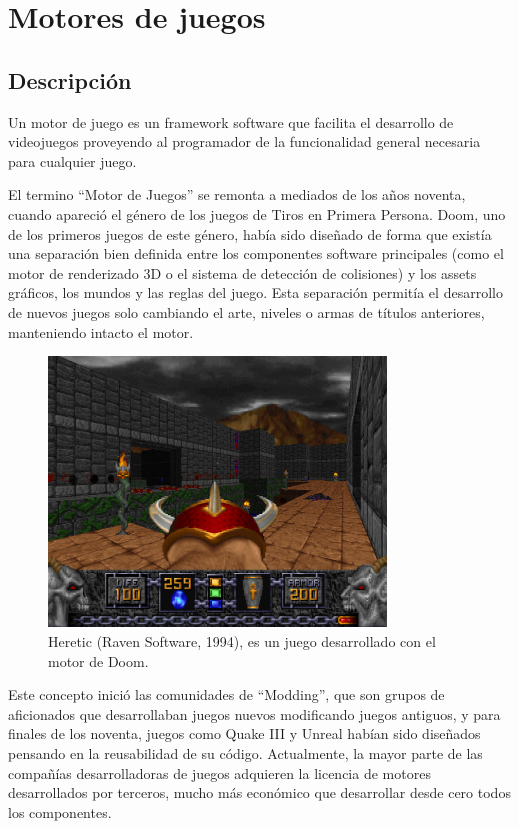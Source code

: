 \section{Motores de juegos}
\subsection{Descripción}
Un motor de juego es un framework software que facilita el desarrollo de videojuegos proveyendo al programador de la funcionalidad general necesaria para cualquier juego\cite{game_engine}.

El termino ``Motor de Juegos'' se remonta a mediados de los años noventa, cuando apareció el género de los juegos de Tiros en Primera Persona. Doom, uno de los primeros juegos de este género, había sido diseñado de forma que existía una separación bien definida entre los componentes software principales (como el motor de renderizado 3D o el sistema de detección de colisiones) y los assets gráficos, los mundos y las reglas del juego. Esta separación permitía el desarrollo de nuevos juegos solo cambiando el arte, niveles o armas de títulos anteriores, manteniendo intacto el motor\cite{game_engine_architecture}.

\begin{figure}[h]
    \centering
    \includegraphics[width=0.8\textwidth]{images/estadodelarte/motores/heretic}
    \caption{Heretic (Raven Software, 1994), es un juego desarrollado con el motor de Doom.}
\end{figure}

Este concepto inició las comunidades de ``Modding'', que son grupos de aficionados que desarrollaban juegos nuevos modificando juegos antiguos, y para finales de los noventa, juegos como Quake III y Unreal habían sido diseñados pensando en la reusabilidad de su código. Actualmente, la mayor parte de las compañías desarrolladoras de juegos adquieren la licencia de motores desarrollados por terceros, mucho más económico que desarrollar desde cero todos los componentes.

